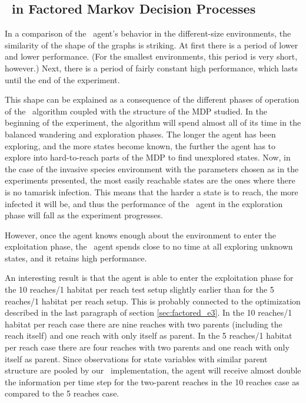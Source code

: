 \subsection{\etre\ in Factored Markov Decision Processes 
}
\label{sec:e3_factored_discussion}

In a comparison of the \etre\ agent's behavior in the different-size environments, the similarity of the shape of the graphs is striking. At first there is a period of lower and lower performance. (For the smallest environments, this period is very short, however.) Next, there is a period of fairly constant high performance, which lasts until the end of the experiment.  

This shape can be explained as a consequence of the different phases of operation of the \etre\ algorithm coupled with the structure of the MDP studied. In the beginning of the experiment, the algorithm will spend almost all of its time in the balanced wandering and exploration phases. The longer the agent has been exploring, and the more states become known, the further the agent has to explore into hard-to-reach parts of the MDP to find unexplored states. Now, in the case of the invasive species environment with the parameters chosen as in the experiments presented, the most easily reachable states are the ones where there is no tamarisk infection. This means that the harder a state is to reach, the more infected it will be, and thus the performance of the \etre\ agent in the exploration phase will fall as the experiment progresses. 

However, once the agent knows enough about the environment to enter the exploitation phase, the \etre\ agent spends close to no time at all exploring unknown states, and it retains high performance. 

An interesting result is that the agent is able to enter the exploitation phase for the 10 reaches/1 habitat per reach test setup slightly earlier than for the 5 reaches/1 habitat per reach setup. This is probably connected to the optimization described in the last paragraph of section \ref{sec:factored_e3}. In the 10 reaches/1 habitat per reach case there are nine reaches with two parents (including the reach itself) and one reach with only itself as parent. In the 5 reaches/1 habitat per reach case there are four reaches with two parents and one reach with only itself as parent. Since observations for state variables with similar parent structure are pooled by our \etre\ implementation, the agent will receive almost double the information per time step for the two-parent reaches in the 10 reaches case as compared to the 5 reaches case.  


